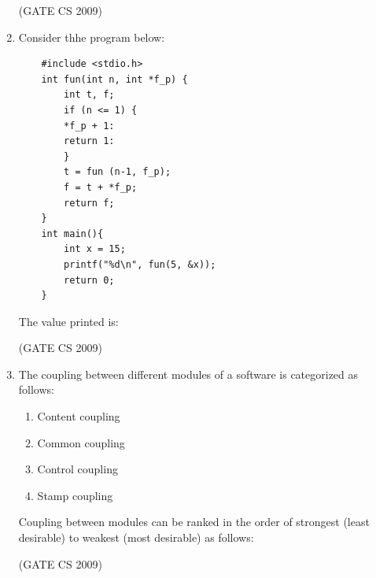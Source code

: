 \documentclass[a4paper, 11pt]{article}
\begin{document}
\begin{enumerate}
    \hfill (GATE CS 2009)

    \item Consider thhe program below:
    \begin{lstlisting}
    #include <stdio.h>
    int fun(int n, int *f_p) {
        int t, f;
        if (n <= 1) {
        *f_p + 1:
        return 1:
        }
        t = fun (n-1, f_p);
        f = t + *f_p;
        return f;
    }
    int main(){
        int x = 15;
        printf("%d\n", fun(5, &x));
        return 0;
    }
    \end{lstlisting}
    The value printed is: 
    \begin{enumerate}
    \end{enumerate}

    \hfill (GATE CS 2009)

    \item The coupling between different modules of a software is categorized as follows:
    \begin{enumerate}[label=\Roman*]
        \item Content coupling
        \item Common coupling 
        \item Control coupling
        \item Stamp coupling
    \end{enumerate}
    Coupling between modules can be ranked in the order of strongest (least desirable) to weakest (most desirable) as follows:
    \begin{enumerate}
    \end{enumerate}

    \hfill (GATE CS 2009)


\end{enumerate}
\end{document}
